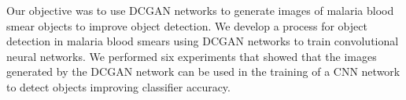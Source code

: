 Our objective was to use DCGAN networks to generate images of malaria blood smear objects to improve object detection. We develop a process for object detection in malaria blood smears using DCGAN networks to train convolutional neural networks. We performed six experiments that showed that the images generated by the DCGAN network can be used in the training of a CNN network to detect objects improving classifier accuracy.
